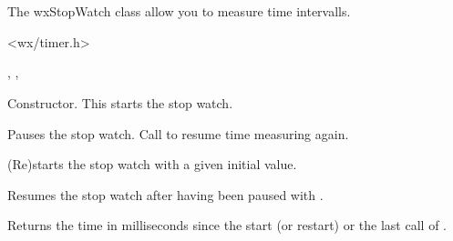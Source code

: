 \section{}\label{wxstopwatch}

The wxStopWatch class allow you to measure time intervalls. 


<wx/timer.h>


, , 




Constructor. This starts the stop watch.

\label{wxstopwatchpause}


Pauses the stop watch. Call  to resume 
time measuring again.



(Re)starts the stop watch with a given initial value.

\label{wxstopwatchresume}


Resumes the stop watch after having been paused with .


\label{wxstopwatchtime}

Returns the time in milliseconds since the start (or restart) or the last call of 
.

